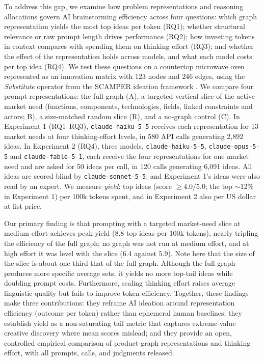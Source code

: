 To address this gap, we examine how problem representations and reasoning allocations govern AI brainstorming efficiency across four questions: which graph representation yields the most top ideas per token (RQ1); whether structural relevance or raw prompt length drives performance (RQ2); how investing tokens in context compares with spending them on thinking effort (RQ3); and whether the effect of the representation holds across models, and what each model costs per top idea (RQ4). We test these questions on a countertop microwave oven represented as an innovation matrix with 123 nodes and 246 edges, using the \emph{Substitute} operator from the SCAMPER ideation framework \citep{Eberle1971, Osborn1953}. We compare four prompt representations: the full graph (A), a targeted vertical slice of the active market need (functions, components, technologies, fields, linked constraints and actors; B), a size-matched random slice (R), and a no-graph control (C). In Experiment 1 (RQ1--RQ3), \texttt{claude-haiku-5-5} receives each representation for 13 market needs at four thinking-effort levels, in 580 API calls generating 2,892 ideas. In Experiment 2 (RQ4), three models, \texttt{claude-haiku-5-5}, \texttt{claude-opus-5-5} and \texttt{claude-fable-5-1}, each receive the four representations for one market need and are asked for 50 ideas per call, in 120 calls generating 6,091 ideas. All ideas are scored blind by \texttt{claude-sonnet-5-5}, and Experiment 1's ideas were also read by an expert. We measure \emph{yield}: top ideas (score $\ge 4.0/5.0$; the top $\sim$12\% in Experiment 1) per 100k tokens spent, and in Experiment 2 also per US dollar at list price.

Our primary finding is that prompting with a targeted market-need slice at medium effort achieves peak yield (8.8 top ideas per 100k tokens), nearly tripling the efficiency of the full graph; no graph was not run at medium effort, and at high effort it was level with the slice (6.4 against 5.9). Note here that the size of the slice is about one third that of the full graph. Although the full graph produces more specific average sets, it yields no more top-tail ideas while doubling prompt costs. Furthermore, scaling thinking effort raises average linguistic quality but fails to improve token efficiency. Together, these findings make three contributions: they reframe AI ideation around representation efficiency (outcome per token) rather than ephemeral human baselines; they establish yield as a non-saturating tail metric that captures extreme-value creative discovery where mean scores mislead; and they provide an open, controlled empirical comparison of product-graph representations and thinking effort, with all prompts, calls, and judgments released.

